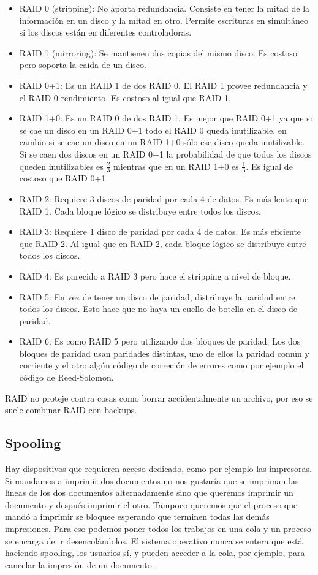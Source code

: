\documentclass{article}
\begin{document}
\begin{itemize}
\item RAID 0 (stripping): No aporta redundancia. Consiste en tener la mitad de la informaci\'on en un disco y la mitad en otro. Permite escrituras en simult\'aneo si los discos est\'an en diferentes controladoras.
\item RAID 1 (mirroring): Se mantienen dos copias del mismo disco. Es costoso pero soporta la caida de un disco.
\item RAID 0+1: Es un RAID 1 de dos RAID 0. El RAID 1 provee redundancia y el RAID 0 rendimiento. Es costoso al igual que RAID 1.
\item RAID 1+0: Es un RAID 0 de dos RAID 1. Es mejor que RAID 0+1 ya que si se cae un disco en un RAID 0+1 todo el RAID 0 queda inutilizable, en cambio si se cae un disco en un RAID 1+0 s\'olo ese disco queda inutilizable. Si se caen dos discos en un RAID 0+1 la probabilidad de que todos los discos queden inutilizables es $\frac{2}{3}$ mientras que en un RAID 1+0 es $\frac{1}{3}$. Es igual de costoso que RAID 0+1.
\item RAID 2: Requiere 3 discos de paridad por cada 4 de datos. Es m\'as lento que RAID 1. Cada bloque l\'ogico se distribuye entre todos los discos.
\item RAID 3: Requiere 1 disco de paridad por cada 4 de datos. Es m\'as eficiente que RAID 2. Al igual que en RAID 2, cada bloque l\'ogico se distribuye entre todos los discos.
\item RAID 4: Es parecido a RAID 3 pero hace el stripping a nivel de bloque.
\item RAID 5: En vez de tener un disco de paridad, distribuye la paridad entre todos los discos. Esto hace que no haya un cuello de botella en el disco de paridad.
\item RAID 6: Es como RAID 5 pero utilizando dos bloques de paridad. Los dos bloques de paridad usan paridades distintas, uno de ellos la paridad com\'un y corriente y el otro alg\'un c\'odigo de correci\'on de errores como por ejemplo el c\'odigo de Reed-Solomon.
\end{itemize}

RAID no proteje contra cosas como borrar accidentalmente un archivo, por eso se suele combinar RAID con backups.

\subsection{Spooling}

Hay dispositivos que requieren acceso dedicado, como por ejemplo las impresoras. Si mandamos a imprimir dos documentos no nos gustar\'ia que se impriman las l\'ineas de los dos documentos alternadamente sino que queremos imprimir un documento y despu\'es imprimir el otro. Tampoco queremos que el proceso que mand\'o a imprimir se bloquee esperando que terminen todas las dem\'as impresiones. Para eso podemos poner todos los trabajos en una cola y un proceso se encarga de ir desencol\'andolos. El sistema operativo nunca se entera que est\'a haciendo spooling, los usuarios s\'i, y pueden acceder a la cola, por ejemplo, para cancelar la impresi\'on de un documento.
\end{document}
